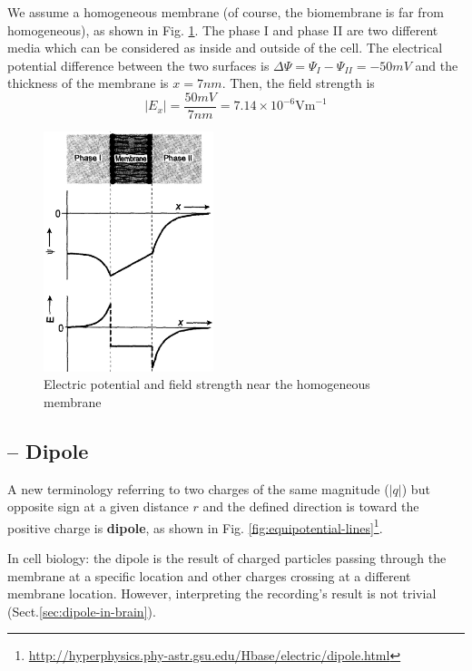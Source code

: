 We assume a homogeneous membrane (of course, the biomembrane is far
from homogeneous), as shown in
Fig. \ref{fig:potential_field-strength}. The phase I and phase II are
two different media which can be considered as inside and outside of
the cell. The electrical potential difference between the two surfaces
is $\Delta \Psi = \Psi_I - \Psi_{II} = -50mV$ and the thickness of the membrane is
$x=7nm$. Then, the field strength is
\begin{equation}
  |E_x| = \frac{50mV}{7nm} = 7.14\times 10^{-6} \text{Vm}^{-1}
\end{equation}
\begin{figure}[htb]
  \centerline{\includegraphics[height=7cm]{./images/potential_field-strength.eps}}
  \caption{Electric potential and field strength near the homogeneous
    membrane}\label{fig:potential_field-strength}
\end{figure}


\subsection{-- Dipole}
\label{sec:dipole}

A new terminology referring to two charges of the same magnitude ($|q|$)
but opposite sign at a given distance $r$ and the defined direction is
toward the positive charge is {\bf dipole}, as shown in Fig.
\ref{fig:equipotential-lines}\footnote{\url{http://hyperphysics.phy-astr.gsu.edu/Hbase/electric/dipole.html}}.

In cell biology: the dipole is the result of charged particles passing through
the membrane at a specific location and other charges crossing at a different
membrane location. However, interpreting the recording's result is not trivial
(Sect.\ref{sec:dipole-in-brain}). 


